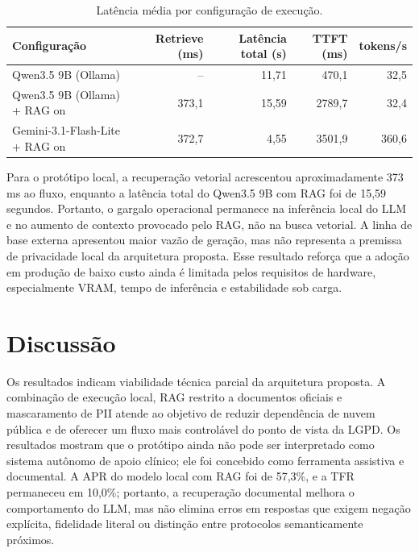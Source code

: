 \documentclass[12pt]{article}
\begin{document}
\begin{table}[H]
  \centering
  \caption{Latência média por configuração de execução.}
  \label{tab:latencia_config}
  \small
  \begin{tabular}{lrrrr}
    \toprule
    \textbf{Configuração} 		& \textbf{Retrieve (ms)} 	& \textbf{Latência total (s)} 	& \textbf{TTFT (ms)} 	& \textbf{tokens/s} \\
    \midrule
    Qwen3.5 9B (Ollama)			& --    		 	& 11,71 			& 470,1  		& 32,5 \\
    Qwen3.5 9B (Ollama)   + RAG on  	& 373,1 			& 15,59 			& 2789,7 		& 32,4 \\
    Gemini-3.1-Flash-Lite + RAG on 	& 372,7 			& 4,55  			& 3501,9 		& 360,6 \\
    \bottomrule
  \end{tabular}
\end{table}

Para o protótipo local, a recuperação vetorial acrescentou aproximadamente 373 ms ao fluxo, enquanto a latência total do Qwen3.5 9B com RAG foi de 15,59 segundos.
Portanto, o gargalo operacional permanece na inferência local do LLM e no aumento de contexto provocado pelo RAG, não na busca vetorial.
A linha de base externa apresentou maior vazão de geração, mas não representa a premissa de privacidade local da arquitetura proposta.
Esse resultado reforça que a adoção em produção de baixo custo ainda é limitada pelos requisitos de hardware, especialmente VRAM, tempo de inferência e estabilidade sob carga.


\section{Discussão}\label{sec:discussao}
Os resultados indicam viabilidade técnica parcial da arquitetura proposta.
A combinação de execução local, RAG restrito a documentos oficiais e mascaramento de PII atende ao objetivo de reduzir dependência de nuvem pública e de oferecer um fluxo mais controlável do ponto de vista da LGPD.
Os resultados mostram que o protótipo ainda não pode ser interpretado como sistema autônomo de apoio clínico; ele foi concebido como ferramenta assistiva e documental.
A APR do modelo local com RAG foi de 57,3\%, e a TFR permaneceu em 10,0\%; portanto, a recuperação documental melhora o comportamento do LLM, mas não elimina erros em respostas que exigem negação explícita, fidelidade literal ou distinção entre protocolos semanticamente próximos.
\end{document}
